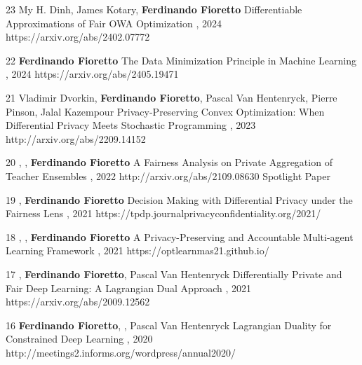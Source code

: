 \begin{pubs}
\wsentry
	{23}
	{\student{}My H. Dinh, \student{} James Kotary, {\bf Ferdinando Fioretto}}
	{Differentiable Approximations of Fair OWA Optimization}
	{, 2024}
	{https://arxiv.org/abs/2402.07772}

\wsentry
	{22}
	{{\bf Ferdinando Fioretto}}
	{The Data Minimization Principle in Machine Learning}
	{, 2024}
	{https://arxiv.org/abs/2405.19471}

\wsentry 
	{21}%
	{Vladimir Dvorkin, {\bf Ferdinando Fioretto}, Pascal Van Hentenryck, Pierre Pinson, Jalal Kazempour}
	{Privacy-Preserving Convex Optimization: When Differential Privacy Meets Stochastic Programming}
	{, 2023}
	{http://arxiv.org/abs/2209.14152}


	\wsentryAwd
	{20} %
	{, , {\bf Ferdinando Fioretto}}
	{A Fairness Analysis on Private Aggregation of Teacher Ensembles}
	{, 2022}
	{http://arxiv.org/abs/2109.08630}
	{Spotlight Paper}
	
	\wsentry
	{19} %
	{, {\bf Ferdinando Fioretto}}
	{Decision Making with Differential Privacy under the Fairness Lens}
	{, 2021}
	{https://tpdp.journalprivacyconfidentiality.org/2021/}
 	
	\wsentry
	{18} %
	{, , {\bf Ferdinando Fioretto}}
	{A Privacy-Preserving and Accountable Multi-agent Learning Framework}
	{, 2021}
	{https://optlearnmas21.github.io/}

	\wsentry
	{17} %
	{, {\bf Ferdinando Fioretto}, Pascal Van 	Hentenryck}
	{Differentially Private and Fair Deep Learning: A Lagrangian Dual Approach}
	{, 2021}
	{https://arxiv.org/abs/2009.12562}

\wsentry 
	{16} %
	{{\bf Ferdinando Fioretto}, , Pascal Van Hentenryck}
	{Lagrangian Duality for Constrained Deep Learning}
	{, 2020}
	{http://meetings2.informs.org/wordpress/annual2020/}


\end{pubs}
